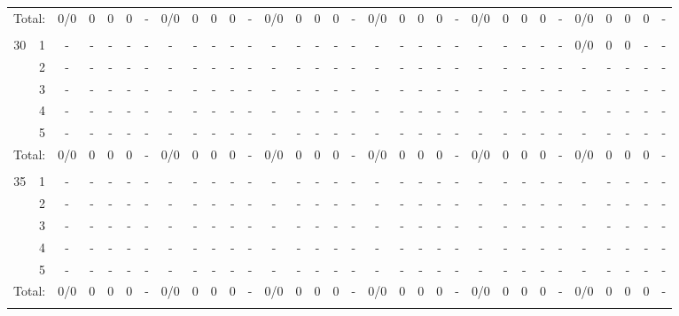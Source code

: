 \documentclass[a1paper]{article}
\begin{document}
\begin{tabular}{cc ccccc|ccccc|ccccc|ccccc|ccccc|ccccc}
\multicolumn{2}{c}{Total:} & 0/0& 0& 0& 0 & - & 0/0& 0& 0& 0 & - & 0/0& 0& 0& 0 & - & 0/0& 0& 0& 0 & - & 0/0& 0& 0& 0 & - & 0/0& 0& 0& 0 & - \\\\
\multirow{5}{*}{30} & 1 & - & - & - & - & -& - & - & - & - & -& - & - & - & - & -& - & - & - & - & -& - & - & - & - & - & 0/0 & 0 & 0 & - & -	\\ & 2 & - & - & - & - & -& - & - & - & - & -& - & - & - & - & -& - & - & - & - & -& - & - & - & - & -& - & - & - & - & -	\\ & 3 & - & - & - & - & -& - & - & - & - & -& - & - & - & - & -& - & - & - & - & -& - & - & - & - & -& - & - & - & - & -	\\ & 4 & - & - & - & - & -& - & - & - & - & -& - & - & - & - & -& - & - & - & - & -& - & - & - & - & -& - & - & - & - & -	\\ & 5 & - & - & - & - & -& - & - & - & - & -& - & - & - & - & -& - & - & - & - & -& - & - & - & - & -& - & - & - & - & -	\\\cline{3-32}
\multicolumn{2}{c}{Total:} & 0/0& 0& 0& 0 & - & 0/0& 0& 0& 0 & - & 0/0& 0& 0& 0 & - & 0/0& 0& 0& 0 & - & 0/0& 0& 0& 0 & - & 0/0& 0& 0& 0 & - \\\\
\multirow{5}{*}{35} & 1 & - & - & - & - & -& - & - & - & - & -& - & - & - & - & -& - & - & - & - & -& - & - & - & - & -& - & - & - & - & -	\\ & 2 & - & - & - & - & -& - & - & - & - & -& - & - & - & - & -& - & - & - & - & -& - & - & - & - & -& - & - & - & - & -	\\ & 3 & - & - & - & - & -& - & - & - & - & -& - & - & - & - & -& - & - & - & - & -& - & - & - & - & -& - & - & - & - & -	\\ & 4 & - & - & - & - & -& - & - & - & - & -& - & - & - & - & -& - & - & - & - & -& - & - & - & - & -& - & - & - & - & -	\\ & 5 & - & - & - & - & -& - & - & - & - & -& - & - & - & - & -& - & - & - & - & -& - & - & - & - & -& - & - & - & - & -	\\\cline{3-32}
\multicolumn{2}{c}{Total:} & 0/0& 0& 0& 0 & - & 0/0& 0& 0& 0 & - & 0/0& 0& 0& 0 & - & 0/0& 0& 0& 0 & - & 0/0& 0& 0& 0 & - & 0/0& 0& 0& 0 & - \\\\
\end{tabular}
\end{document}
